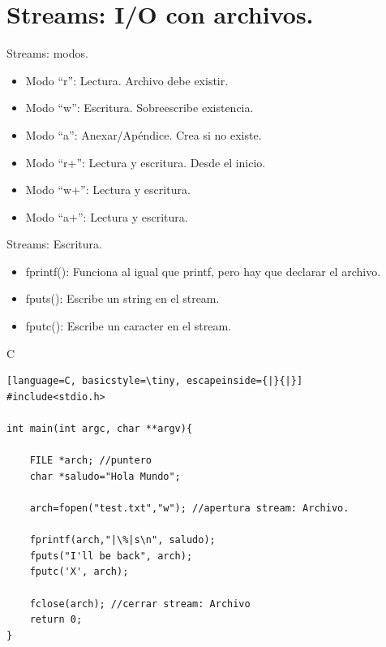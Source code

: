 \documentclass{beamer}
\begin{document}
\section{Streams: I/O con archivos.}
\begin{frame}[fragile]{Streams: modos.}
\begin{itemize}
	\item Modo ``r'': Lectura. Archivo debe existir.
	\item Modo ``w'': Escritura. Sobreescribe existencia.
	\item Modo ``a'': Anexar/Apéndice. Crea si no existe.
	\item Modo ``r+'': Lectura y escritura. Desde el inicio. 
	\item Modo ``w+'': Lectura y escritura. 
	\item Modo ``a+'': Lectura y escritura.
\end{itemize}
\end{frame}

\begin{frame}[fragile]{Streams: Escritura.}
\begin{itemize}
	\item fprintf(): Funciona al igual que printf, pero hay que declarar el archivo.
	\item fputs(): Escribe un string en el stream.
	\item fputc(): Escribe un caracter en el stream.
	\end{itemize}
\begin{exampleblock}{C}
\begin{lstlisting}[language=C, basicstyle=\tiny, escapeinside={|}{|}]
#include<stdio.h>

int main(int argc, char **argv){

	FILE *arch; //puntero
	char *saludo="Hola Mundo";

	arch=fopen("test.txt","w"); //apertura stream: Archivo.

	fprintf(arch,"|\%|s\n", saludo);
	fputs("I'll be back", arch);
	fputc('X', arch);

	fclose(arch); //cerrar stream: Archivo
	return 0;
}
\end{lstlisting}
\end{exampleblock}
\end{frame}
\end{document}
